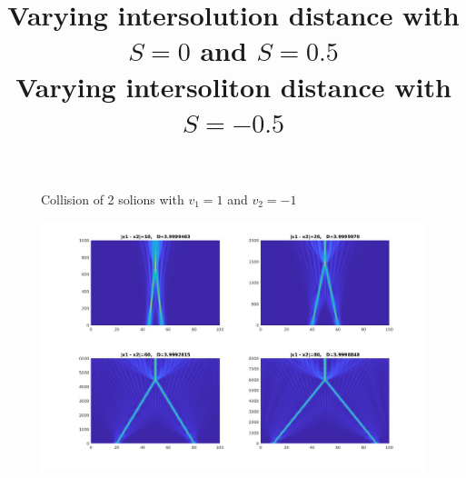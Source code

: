 \documentclass{article}
\begin{document}
\begin{enumerate}
\begin{figure}[h!]
\title{Varying intersolution distance with $S=0$ and $S=0.5$\\}
\hfill
{}
\caption{Collision of 2 solions with $v_1=1$ and $v_2=-1$}
\end{figure}
\pagebreak
\begin{figure}
\title{Varying intersoliton distance with $S=-0.5$\\}
\includegraphics[scale=0.4]{3D_X_Sneg05.jpg}

\end{figure}
\end{enumerate}
\end{document}
